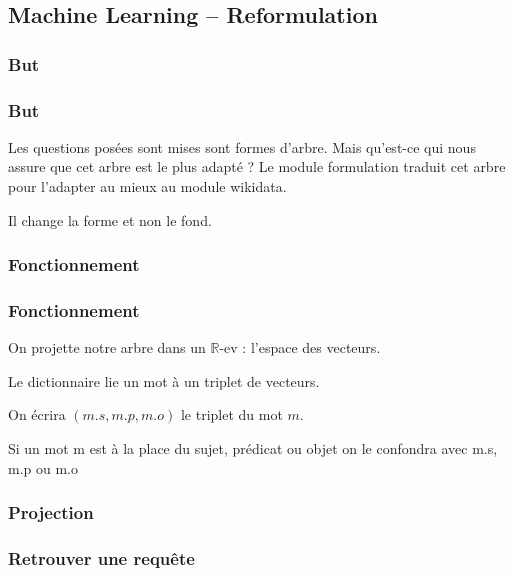 \subsection{Machine Learning \--- Reformulation}
\newcommand{\N}{\textcolor{red}{TO\_REPLACE}}

\subsubsection{But}

\begin{frame}
\frametitle{But}
Les questions posées sont mises sont formes d'arbre. Mais qu'est-ce qui nous assure que cet arbre est le plus adapté ?
\pause
Le module formulation traduit cet arbre pour l'adapter au mieux au module wikidata.

Il change la forme et non le fond.
\end{frame}

\subsubsection{Fonctionnement}
\begin{frame}
\frametitle{Fonctionnement}
On projette notre arbre dans un $\mathbb{R}$-ev : l'espace des vecteurs.

\begin{defi}
Le dictionnaire lie un mot à un triplet de vecteurs.

On écrira $(m.s,m.p,m.o)$ le triplet du mot $m$.
\end{defi}

Si un mot m est à la place du sujet, prédicat ou objet on le confondra avec m.s, m.p ou m.o

\end{frame}

\begin{frame}
\frametitle{Projection}
\end{frame}

\subsubsection{Retrouver une requête}

